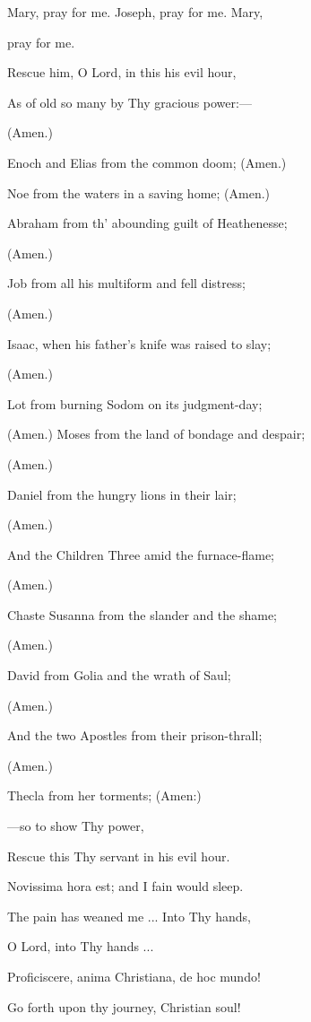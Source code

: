 Mary, pray for me. Joseph, pray for me. Mary,

pray for me.


Rescue him, O Lord, in this his evil hour,

As of old so many by Thy gracious power:—

(Amen.)

Enoch and Elias from the common doom; (Amen.)

Noe from the waters in a saving home; (Amen.)

Abraham from th' abounding guilt of Heathenesse;

(Amen.)

Job from all his multiform and fell distress;

(Amen.)

Isaac, when his father's knife was raised to slay;

(Amen.)

Lot from burning Sodom on its judgment-day;

(Amen.)
Moses from the land of bondage and despair;

(Amen.)

Daniel from the hungry lions in their lair;

(Amen.)

And the Children Three amid the furnace-flame;

(Amen.)

Chaste Susanna from the slander and the shame;

(Amen.)

David from Golia and the wrath of Saul;

(Amen.)

And the two Apostles from their prison-thrall;

(Amen.)

Thecla from her torments; (Amen:)

—so to show Thy power,

Rescue this Thy servant in his evil hour.


Novissima hora est; and I fain would sleep.

The pain has weaned me ... Into Thy hands,

O Lord, into Thy hands ...


Proficiscere, anima Christiana, de hoc mundo!

Go forth upon thy journey, Christian soul!

